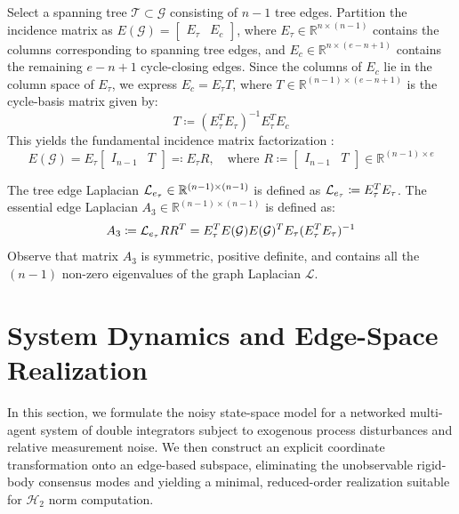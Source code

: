 Select a spanning tree $\mathcal{T} \subset \mathcal{G}$ consisting of $n-1$ tree edges. Partition the incidence matrix as $E(\mathcal{G}) = \begin{bmatrix} E_\tau & E_c \end{bmatrix}$, where $E_\tau \in \mathbb{R}^{n \times (n-1)}$ contains the columns corresponding to spanning tree edges, and $E_c \in \mathbb{R}^{n \times (e-n+1)}$ contains the remaining $e-n+1$ cycle-closing edges. Since the columns of $E_c$ lie in the column space of $E_\tau$, we express $E_c = E_\tau T$, where $T \in \mathbb{R}^{(n-1) \times (e-n+1)}$ is the cycle-basis matrix given by:
\begin{equation}\label{eq:ch_RA_T_matrix}
	T \coloneqq (E_\tau^T E_\tau)^{-1} E_\tau^T E_c
\end{equation}
This yields the fundamental incidence matrix factorization \cite{godsil2001algebraic, zelazo2013performance}:
\begin{equation}\label{eq:ch_RA_incidence_factorization}
	E(\mathcal{G}) = E_\tau \begin{bmatrix} I_{n-1} & T \end{bmatrix} \eqcolon E_\tau R, \quad \text{where } R \coloneqq \begin{bmatrix} I_{n-1} & T \end{bmatrix} \in \mathbb{R}^{(n-1) \times e}
\end{equation}

The tree edge Laplacian $\mathcal{L}_{e_{\tau}} \in \mathbb{R}^{(n-1) \times (n-1)}$ is defined as $\mathcal{L}_{e_{\tau}} \coloneqq E_\tau^T E_\tau$. The essential edge Laplacian $A_3 \in \mathbb{R}^{(n-1) \times (n-1)}$ is defined as:
\begin{equation}\label{eq:ch_RA_A3_def}
	A_3 \coloneqq \mathcal{L}_{e_{\tau}} R R^T = E_\tau^T E(\mathcal{G}) E(\mathcal{G})^T E_\tau (E_\tau^T E_\tau)^{-1}
\end{equation}
Observe that matrix $A_3$ is symmetric, positive definite, and contains all the $(n-1)$ non-zero eigenvalues of the graph Laplacian $\mathcal{L}$.



\section{System Dynamics and Edge-Space Realization}\label{sec:ch_RA_problem_formulation}
In this section, we formulate the noisy state-space model for a networked multi-agent system of double integrators subject to exogenous process disturbances and relative measurement noise. We then construct an explicit coordinate transformation onto an edge-based subspace, eliminating the unobservable rigid-body consensus modes and yielding a minimal, reduced-order realization suitable for $\mathcal{H}_2$ norm computation.


